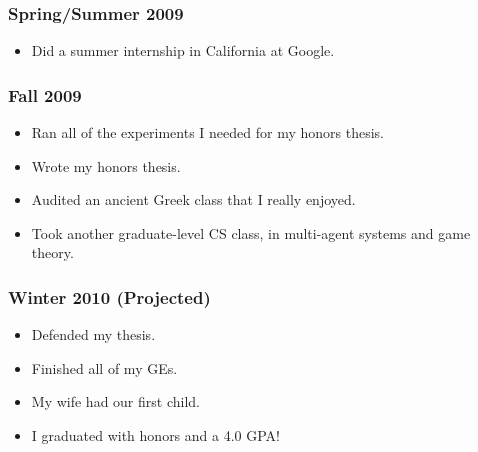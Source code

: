\documentclass[onecolumn, 10pt]{article}
\begin{document}
\subsubsection*{Spring/Summer 2009}
\begin{itemize}
  \item Did a summer internship in California at Google.
\end{itemize}
\subsubsection*{Fall 2009}
\begin{itemize}
  \item Ran all of the experiments I needed for my honors thesis.
  \item Wrote my honors thesis.
  \item Audited an ancient Greek class that I really enjoyed.
  \item Took another graduate-level CS class, in multi-agent systems and game
	theory.
\end{itemize}
\subsubsection*{Winter 2010 (Projected)}
\begin{itemize}
  \item Defended my thesis.
  \item Finished all of my GEs.
  \item My wife had our first child.
  \item I graduated with honors and a 4.0 GPA!
\end{itemize}
\end{document}
